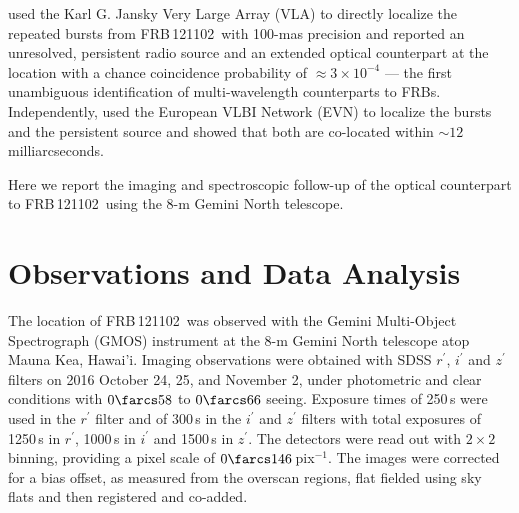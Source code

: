 \documentclass[twocolumn]{aastex61}
\def \frb {FRB\,121102}
\begin{document}
\citet{clw+16} used the Karl G. Jansky Very Large Array (VLA) to directly localize the repeated bursts from \frb\ with 100-mas precision and reported an unresolved, persistent radio source and an extended optical counterpart at the location with a chance coincidence probability of $\approx 3\times10^{-4}$ --- the first unambiguous identification of multi-wavelength counterparts to FRBs. Independently, \citet{mph+16} used the European VLBI Network (EVN) to localize the bursts and the persistent source and showed that both are co-located within $\sim12$ milliarcseconds.

Here we report the imaging and spectroscopic follow-up of the optical counterpart to \frb\ using the 8-m Gemini North telescope. 





\section{Observations and Data Analysis}
\label{sec:obs}

The location of \frb\ was observed with the Gemini Multi-Object
Spectrograph (GMOS) instrument at the 8-m Gemini North telescope atop
Mauna Kea, Hawai'i. Imaging observations were obtained with SDSS
$r^\prime$, $i^\prime$ and $z^\prime$ filters on 2016 October 24, 25, and
November 2, under photometric and clear conditions with
$0\farcs58$ to $0\farcs66$ seeing. Exposure times of 250\,s were used in the $r^\prime$ filter and of 300\,s in the $i^\prime$ and $z^\prime$ filters with total exposures of 1250\,s in $r^\prime$, 1000\,s
in $i^\prime$ and 1500\,s in $z^\prime$. The detectors were read out with $2\times2$ binning, providing a pixel scale of $0\farcs146$\,pix$^{-1}$. The
images were corrected for a bias offset, as measured from the overscan
regions, flat fielded using sky flats and then registered and
co-added.
\end{document}
